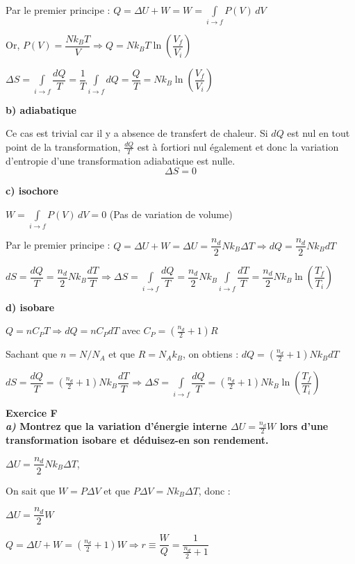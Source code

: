 \documentclass	[11pt, a4paper, openany]{book}
\newcommand{\exerc}[2]{\textbf{\Large Exercice #1\normalsize \\#2}}
\begin{document}
		Par le premier principe : $ Q = \Delta U + W = W = \int  \limits_{i \to f} P(V)\,dV$
		
		Or, $ P(V) = \dfrac{Nk_BT}{V} \Rightarrow Q = Nk_BT\ln \left(\dfrac{V_f}{V_i}\right)$
		
		$ \Delta S = \int \limits_{i \to f} \dfrac{dQ}{T} = \dfrac{1}{T} \int \limits_{i \to f} dQ = \dfrac{Q}{T} = Nk_B\ln \left(\dfrac{V_f}{V_i}\right)$
	
	\textbf{b) adiabatique}
		
		Ce cas est trivial car il y a absence de transfert de chaleur. Si $dQ$ est nul en tout point de la transformation, $\frac{dQ}{T}$ est à fortiori nul également et donc la variation d'entropie d'une transformation adiabatique est nulle. $$\Delta S = 0$$
		
	\textbf{c) isochore}
	
		$W = \int  \limits_{i \to f} P(V)\,dV = 0$ (Pas de variation de volume)
		
		Par le premier principe : $ Q = \Delta U + W = \Delta U = \dfrac{n_d}{2}Nk_B\Delta T \Rightarrow dQ = \dfrac{n_d}{2}Nk_BdT $
		
		$ dS = \dfrac{dQ}{T} = \dfrac{n_d}{2}Nk_B\dfrac{dT}{T} \Rightarrow \Delta S = \int \limits_{i \to f} \dfrac{dQ}{T} = \dfrac{n_d}{2}Nk_B \int \limits_{i \to f} \dfrac{dT}{T} = \dfrac{n_d}{2}Nk_B\ln \left(\dfrac{T_f}{T_i}\right)$
		
	\textbf{d) isobare}
		
		$ Q = nC_PT \Rightarrow dQ = nC_PdT$ avec $ C_P = (\frac{n_d}{2}+1)R$
		
		Sachant que $n = N/N_A$ et que $R = N_Ak_B$, on obtiens : $dQ = (\frac{n_d}{2}+1)Nk_BdT $
		
		$dS = \dfrac{dQ}{T} = (\frac{n_d}{2}+1)Nk_B\dfrac{dT}{T} \Rightarrow \Delta S = \int \limits_{i \to f} \dfrac{dQ}{T} = (\frac{n_d}{2}+1)Nk_B\ln \left(\dfrac{T_f}{T_i}\right)$

\vspace{0,5cm}

\exerc{F}{\textit{a)} Montrez que la variation d'énergie interne $\Delta U = \frac{n_d}{2}W$ lors d'une transformation isobare et déduisez-en son rendement.}
		
		$\Delta U = \dfrac{n_d}{2}Nk_B\Delta T $,
		
		On sait que $W = P\Delta V$ et que $ P\Delta V = Nk_B\Delta T$, donc :
		
		$ \Delta U = \dfrac{n_d}{2}W$
		
		$Q = \Delta U + W = (\frac{n_d}{2}+1)W \Rightarrow r \equiv \dfrac{W}{Q} = \dfrac{1}{\frac{n_d}{2}+1}$
		
\end{document}
